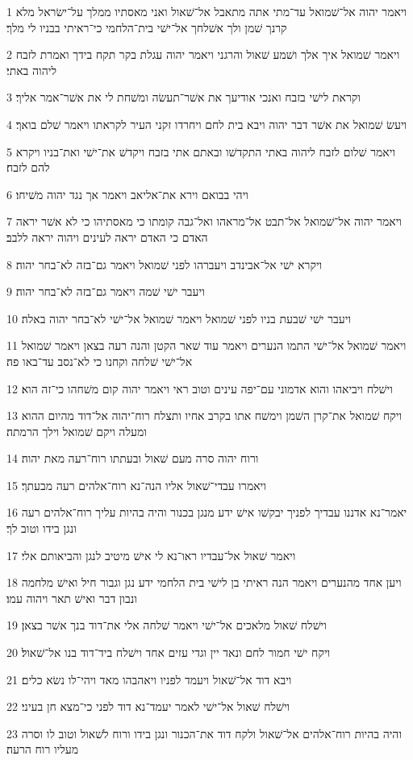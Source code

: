 \par 1 ויאמר יהוה אל־שׁמואל עד־מתי אתה מתאבל אל־שׁאול ואני מאסתיו ממלך על־ישׂראל מלא קרנך שׁמן ולך אשׁלחך אל־ישׁי בית־הלחמי כי־ראיתי בבניו לי מלך׃
\par 2 ויאמר שׁמואל איך אלך ושׁמע שׁאול והרגני ויאמר יהוה עגלת בקר תקח בידך ואמרת לזבח ליהוה באתי׃
\par 3 וקראת לישׁי בזבח ואנכי אודיעך את אשׁר־תעשׂה ומשׁחת לי את אשׁר־אמר אליך׃
\par 4 ויעשׂ שׁמואל את אשׁר דבר יהוה ויבא בית לחם ויחרדו זקני העיר לקראתו ויאמר שׁלם בואך׃
\par 5 ויאמר שׁלום לזבח ליהוה באתי התקדשׁו ובאתם אתי בזבח ויקדשׁ את־ישׁי ואת־בניו ויקרא להם לזבח׃
\par 6 ויהי בבואם וירא את־אליאב ויאמר אך נגד יהוה משׁיחו׃
\par 7 ויאמר יהוה אל־שׁמואל אל־תבט אל־מראהו ואל־גבה קומתו כי מאסתיהו כי לא אשׁר יראה האדם כי האדם יראה לעינים ויהוה יראה ללבב׃
\par 8 ויקרא ישׁי אל־אבינדב ויעברהו לפני שׁמואל ויאמר גם־בזה לא־בחר יהוה׃
\par 9 ויעבר ישׁי שׁמה ויאמר גם־בזה לא־בחר יהוה׃
\par 10 ויעבר ישׁי שׁבעת בניו לפני שׁמואל ויאמר שׁמואל אל־ישׁי לא־בחר יהוה באלה׃
\par 11 ויאמר שׁמואל אל־ישׁי התמו הנערים ויאמר עוד שׁאר הקטן והנה רעה בצאן ויאמר שׁמואל אל־ישׁי שׁלחה וקחנו כי לא־נסב עד־באו פה׃
\par 12 וישׁלח ויביאהו והוא אדמוני עם־יפה עינים וטוב ראי ויאמר יהוה קום משׁחהו כי־זה הוא׃
\par 13 ויקח שׁמואל את־קרן השׁמן וימשׁח אתו בקרב אחיו ותצלח רוח־יהוה אל־דוד מהיום ההוא ומעלה ויקם שׁמואל וילך הרמתה׃
\par 14 ורוח יהוה סרה מעם שׁאול ובעתתו רוח־רעה מאת יהוה׃
\par 15 ויאמרו עבדי־שׁאול אליו הנה־נא רוח־אלהים רעה מבעתך׃
\par 16 יאמר־נא אדננו עבדיך לפניך יבקשׁו אישׁ ידע מנגן בכנור והיה בהיות עליך רוח־אלהים רעה ונגן בידו וטוב לך׃
\par 17 ויאמר שׁאול אל־עבדיו ראו־נא לי אישׁ מיטיב לנגן והביאותם אלי׃
\par 18 ויען אחד מהנערים ויאמר הנה ראיתי בן לישׁי בית הלחמי ידע נגן וגבור חיל ואישׁ מלחמה ונבון דבר ואישׁ תאר ויהוה עמו׃
\par 19 וישׁלח שׁאול מלאכים אל־ישׁי ויאמר שׁלחה אלי את־דוד בנך אשׁר בצאן׃
\par 20 ויקח ישׁי חמור לחם ונאד יין וגדי עזים אחד וישׁלח ביד־דוד בנו אל־שׁאול׃
\par 21 ויבא דוד אל־שׁאול ויעמד לפניו ויאהבהו מאד ויהי־לו נשׂא כלים׃
\par 22 וישׁלח שׁאול אל־ישׁי לאמר יעמד־נא דוד לפני כי־מצא חן בעיני׃
\par 23 והיה בהיות רוח־אלהים אל־שׁאול ולקח דוד את־הכנור ונגן בידו ורוח לשׁאול וטוב לו וסרה מעליו רוח הרעה׃

